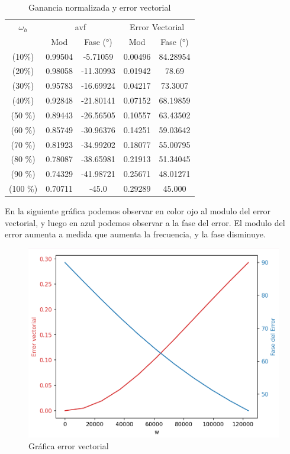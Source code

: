 \begin{table}[H]
\centering
\begin{tabular}{|c|c|c|c|c|}
\hline
\rowcolor[HTML]{3fb55b} 
$\omega_h$ & \multicolumn{2}{c|}{avf}         & \multicolumn{2}{c|}{Error Vectorial} \\ \cline{2-5} 
\rowcolor[HTML]{3fb55b}  
           & Mod & Fase (°)     &  Mod & Fase (°)  \\ \hline
 (10\%) & 0.99504 & -5.71059 &  0.00496   & 84.28954 \\ \hline
 (20\%) & 0.98058 & -11.30993 &  0.01942  & 78.69    \\ \hline
 (30\%) & 0.95783 & -16.69924 &  0.04217  & 73.3007  \\ \hline
 (40\%) & 0.92848 & -21.80141 &  0.07152  & 68.19859  \\ \hline
 (50 \%)& 0.89443 & -26.56505 &  0.10557  & 63.43502  \\ \hline
 (60 \%)& 0.85749 & -30.96376 &  0.14251  & 59.03642  \\ \hline
 (70 \%)& 0.81923 & -34.99202 &  0.18077  &  55.00795 \\ \hline
 (80 \%)& 0.78087 & -38.65981 &  0.21913  & 51.34045  \\ \hline
 (90 \%)& 0.74329 & -41.98721 &  0.25671  & 48.01271   \\ \hline
 (100 \%) &  0.70711 & -45.0    &   0.29289  & 45.000    \\ \hline 

\end{tabular}
\caption{Ganancia normalizada y error vectorial}
\label{tabla-error}
\end{table}
En la siguiente gráfica podemos observar en color ojo al modulo del error vectorial, y luego en azul podemos observar a la fase del error.
El modulo del error aumenta a medida que aumenta la frecuencia, y la fase disminuye.

\begin{figure}[h!]
    \centering
    \includegraphics[width=0.50\linewidth]{img/error_vectorial.png}
    \caption{Gráfica error vectorial}
    \label{fig:errorvectorial}
\end{figure}


